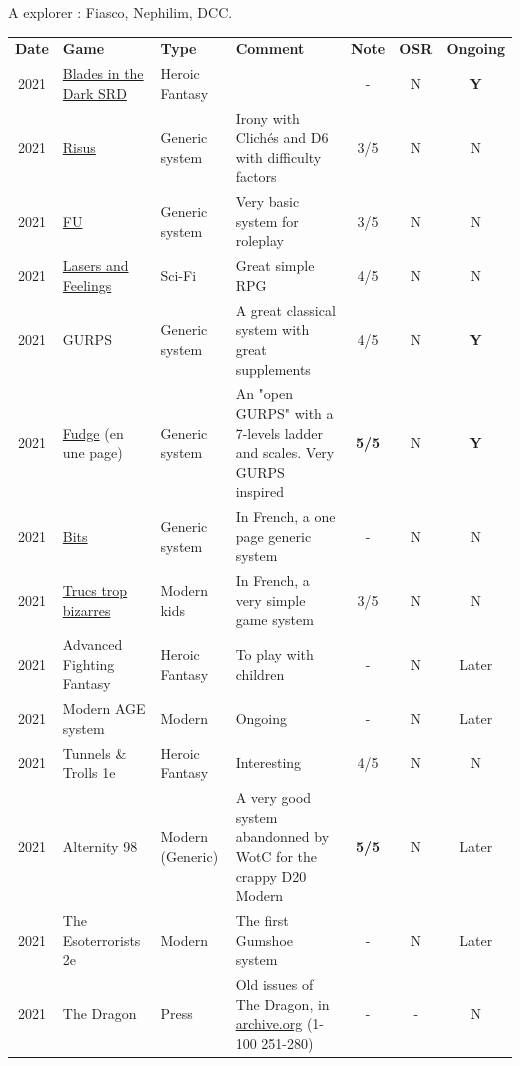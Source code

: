 \documentclass[a4paper, 11pt, twoside]{article}
\begin{document}
A explorer : Fiasco, Nephilim, DCC.

\begin{longtable}{cp{2cm}p{1.5cm}p{7cm}ccc}
\textbf{Date} & \textbf{Game} & \textbf{Type} & \textbf{Comment} & \textbf{Note} & \textbf{OSR} & \textbf{Ongoing}\\
2021 & \href{https://github.com/orey/jdr/tree/master/BladesInTheDark-SRD}{Blades in the Dark SRD} & Heroic Fantasy &  & - & N & \textbf{Y}\\
2021 & \href{https://github.com/orey/jdr/tree/master/Risus-fr}{Risus} & Generic system & Irony with Clichés and D6 with difficulty factors & 3/5 & N & N\\
2021 & \href{https://www.drivethrurpg.com/product/89534/FU-The-Freeform-Universal-RPG-Classic-rules}{FU} & Generic system & Very basic system for roleplay & 3/5 & N & N\\
2021 & \href{http://www.onesevendesign.com/laserfeelings/}{Lasers and Feelings} & Sci-Fi & Great simple RPG & 4/5 & N & N\\
2021 & GURPS & Generic system & A great classical system with great supplements & 4/5 & N & \textbf{Y}\\
2021 & \href{https://github.com/orey/jdr/blob/master/Fudge-fr/FudgeEnUnePage-ORey03.pdf}{Fudge} (en une page) & Generic system & An "open GURPS" with a 7-levels ladder and scales. Very GURPS inspired & \textbf{5/5} & N & \textbf{Y}\\
2021 & \href{http://komajdr.free.fr/fichiers/BiTs.rar}{Bits } & Generic system & In French, a one page generic system & - & N & N\\
2021 & \href{http://storygame.free.fr/}{Trucs trop bizarres} & Modern kids & In French, a very simple game system & 3/5 & N & N\\
2021 & Advanced Fighting Fantasy & Heroic Fantasy & To play with children & - & N & Later\\
2021 & Modern AGE system & Modern & Ongoing & - & N & Later\\
2021 & Tunnels \& Trolls 1e & Heroic Fantasy & Interesting & 4/5 & N & N\\
2021 & Alternity 98 & Modern (Generic) & A very good system abandonned by WotC for the crappy D20 Modern & \textbf{5/5} & N & Later\\
2021 & The Esoterrorists 2e & Modern & The first Gumshoe system & - & N & Later\\
2021 & The Dragon & Press & Old issues of The Dragon, in \href{https://archive.org/details/DragonMagazine045\_201903}{archive.org} (1-100 251-280) & - & - & N\\

\end{longtable}
\end{document}
